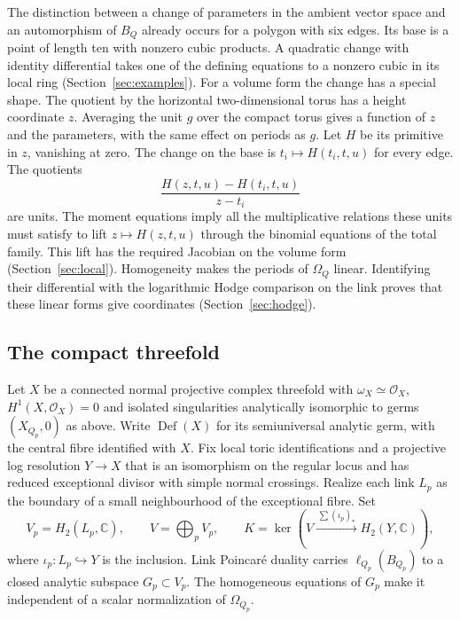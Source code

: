 \documentclass[11pt]{amsart}
\theoremstyle{definition}
\theoremstyle{remark}
\newcommand{\C}{\mathbb C}
\newcommand{\OO}{\mathcal O}
\DeclareMathOperator{\Def}{Def}
\begin{document}
The distinction between a change of parameters in the ambient vector
space and an automorphism of $B_Q$ already occurs for a polygon with
six edges. Its base is a point of length ten with nonzero cubic
products. A quadratic change with identity differential takes one of
the defining equations to a nonzero cubic in its local ring
(Section~\ref{sec:examples}). For a volume form the change has a
special shape. The quotient by the horizontal two-dimensional torus
has a height coordinate $z$. Averaging the unit $g$ over the compact
torus gives a function of $z$ and the parameters, with the same effect
on periods as $g$. Let $H$ be its primitive in $z$, vanishing at zero.
The change on the base is $t_i\mapsto H(t_i,t,u)$ for every edge.
The quotients
\[
  \frac{H(z,t,u)-H(t_i,t,u)}{z-t_i}
\]
are units. The moment equations imply all the multiplicative relations
these units must satisfy to lift $z\mapsto H(z,t,u)$ through the
binomial equations of the total family. This lift has the required
Jacobian on the volume form (Section~\ref{sec:local}). Homogeneity
makes the periods of $\Omega_Q$ linear. Identifying their differential
with the logarithmic Hodge comparison on the link proves that these
linear forms give coordinates (Section~\ref{sec:hodge}).

\subsection*{The compact threefold}
Let $X$ be a connected normal projective complex threefold with
$\omega_X\simeq\OO_X$, $H^1(X,\OO_X)=0$ and isolated singularities
analytically isomorphic to germs $(X_{Q_p},0)$ as above. Write
$\Def(X)$ for its semiuniversal analytic germ, with the central
fibre identified with $X$. Fix local toric
identifications and a projective log resolution $Y\to X$ that is an
isomorphism on the regular locus and has reduced exceptional divisor
with simple normal crossings. Realize each link $L_p$ as the boundary
of a small neighbourhood of the exceptional fibre. Set
\begin{equation}\label{eq:K}
 V_p=H_2(L_p,\C),\qquad V=\bigoplus_p V_p,\qquad
 K=\ker\!\left(V\xrightarrow{\,\sum(\iota_p)_*\,}H_2(Y,\C)\right),
\end{equation}
where $\iota_p:L_p\hookrightarrow Y$ is the inclusion.
Link Poincar\'e duality carries $\ell_{Q_p}(B_{Q_p})$ to a closed
analytic subspace $G_p\subset V_p$. The homogeneous equations of
$G_p$ make it independent of a scalar normalization of $\Omega_{Q_p}$.
\end{document}
